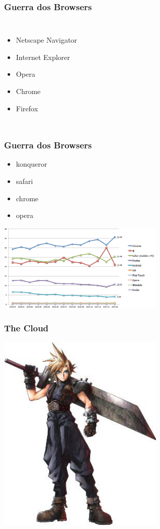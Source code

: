\documentclass{beamer}
\begin{document}
\begin{frame} \frametitle{Guerra dos Browsers}
    \begin{columns}
        \begin{itemize}
            \item Netscape Navigator
            \item Internet Explorer
            \item Opera
            \item Chrome
            \item Firefox
        \end{itemize}
    \end{columns}
\end{frame}

\begin{frame} \frametitle{Guerra dos Browsers}
    \begin{itemize}
     \item konqueror
     \item safari
     \item chrome
     \item opera
    \end{itemize}
\end{frame}

\begin{frame}
    \includegraphics[width=300px]{images/browser-usage}
\end{frame}

\begin{frame} \frametitle{The Cloud}
    \includegraphics[width=300px]{images/cloud-striffe}
\end{frame}
\end{document}
